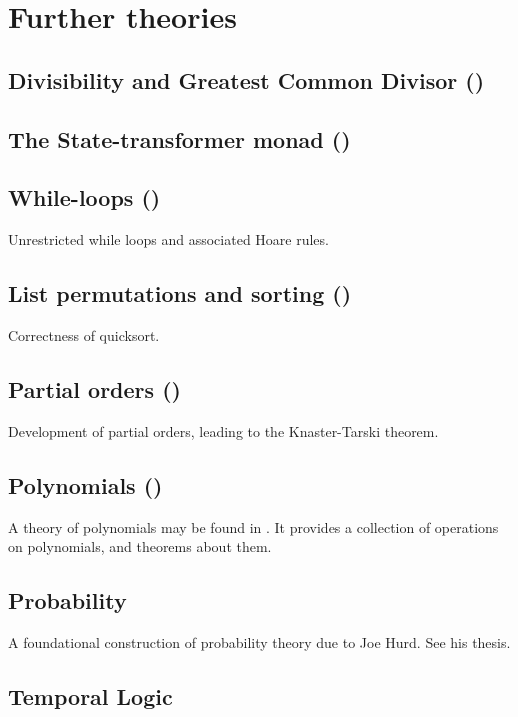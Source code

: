 \section{Further theories}

\subsection{Divisibility and Greatest Common Divisor ()}

\subsection{The State-transformer monad ()}

\subsection{While-loops ()}

Unrestricted while loops and associated Hoare rules.

\subsection{List permutations and sorting ()}
Correctness of quicksort.

\subsection{Partial orders ()}
Development of partial orders, leading to the Knaster-Tarski theorem.

\subsection{Polynomials ()}

A theory of polynomials may be found in .
It provides a collection of operations on polynomials, and theorems about them.

\subsection{Probability}

A foundational construction of probability theory due to Joe Hurd. See his thesis.

\subsection{Temporal Logic}

